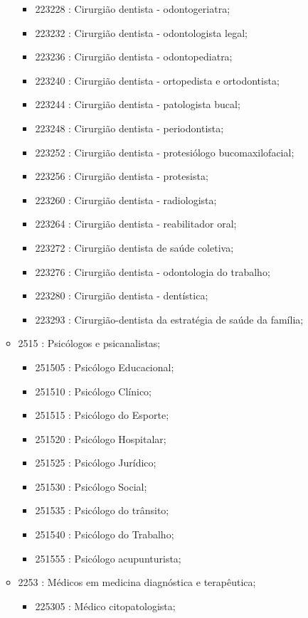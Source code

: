 \begin{itemize}
\begin{itemize}
\begin{itemize}
      \item 223228 : Cirurgião dentista - odontogeriatra;
      \item 223232 : Cirurgião dentista - odontologista legal;
      \item 223236 : Cirurgião dentista - odontopediatra;
      \item 223240 : Cirurgião dentista - ortopedista e ortodontista;
      \item 223244 : Cirurgião dentista - patologista bucal;
      \item 223248 : Cirurgião dentista - periodontista;
      \item 223252 : Cirurgião dentista - protesiólogo bucomaxilofacial;
      \item 223256 : Cirurgião dentista - protesista;
      \item 223260 : Cirurgião dentista - radiologista;
      \item 223264 : Cirurgião dentista - reabilitador oral;
      \item 223272 : Cirurgião dentista de saúde coletiva;
      \item 223276 : Cirurgião dentista - odontologia do trabalho;
      \item 223280 : Cirurgião dentista - dentística;
      \item 223293 : Cirurgião-dentista da estratégia de saúde da família;
    \end{itemize}
    \item 2515 : Psicólogos e psicanalistas;
    \begin{itemize}
      \item 251505 : Psicólogo Educacional;
      \item 251510 : Psicólogo Clínico;
      \item 251515 : Psicólogo do Esporte;
      \item 251520 : Psicólogo Hospitalar;
      \item 251525 : Psicólogo Jurídico;
      \item 251530 : Psicólogo Social;
      \item 251535 : Psicólogo do trânsito;
      \item 251540 : Psicólogo do Trabalho;
      \item 251555 : Psicólogo acupunturista;
    \end{itemize}
    \item 2253 : Médicos em medicina diagnóstica e terapêutica;
    \begin{itemize}
      \item 225305 : Médico citopatologista;

\end{itemize}
\end{itemize}
\end{itemize}
